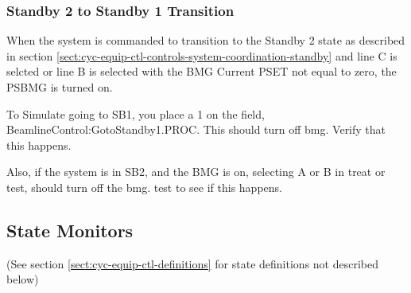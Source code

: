 \documentclass[11pt]{book}		%
\begin{document}
\color{black}

\subsubsection{Standby 2 to Standby 1 Transition}

When the system is commanded to transition to the Standby 2 state as described in section \ref{sect:cyc-equip-ctl-controls-system-coordination-standby} and line C is selcted or line B is selected with the BMG Current PSET not equal to zero, the PSBMG is turned on.

\color{red}

To Simulate going to SB1, you place a 1 on the field, BeamlineControl:GotoStandby1.PROC. This should turn off bmg.  Verify that this happens.

Also, if the system is in SB2, and the BMG is on, selecting A or B in treat or test, should turn off the bmg. test to see if this happens.

\color{black}


\subsection{State Monitors} \label{sect:cyc-equip-ctl-beamline-gcc-state-monitors}
(See section \ref{sect:cyc-equip-ctl-definitions} for state definitions not described below)
\end{document}

